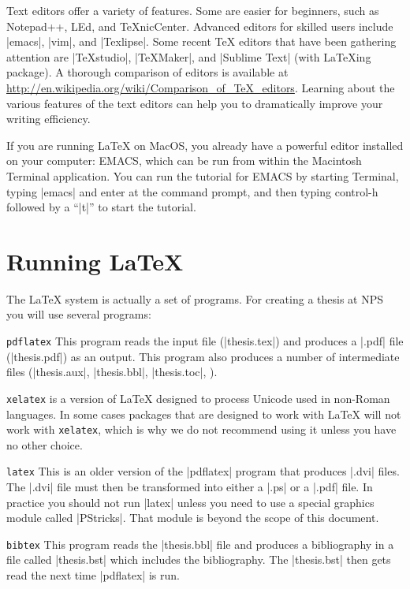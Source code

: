Text editors offer a variety of features.
Some are easier for beginners, such as Notepad++, LEd, and TeXnicCenter.
Advanced editors for skilled users include |emacs|, |vim|, and |Texlipse|.
Some recent TeX editors that have been gathering attention are |TeXstudio|,
|TeXMaker|, and |Sublime Text| (with LaTeXing package).  A thorough comparison
of editors is available at
\url{http://en.wikipedia.org/wiki/Comparison_of_TeX_editors}.  Learning about
the various features of the text editors can help you to dramatically improve
your writing efficiency.

If you are running \LaTeX{} on MacOS, you already have a powerful editor
installed on your computer: EMACS, which can be run from within the Macintosh
Terminal application. You can run the tutorial for EMACS by starting Terminal,
typing |emacs| and enter at the command prompt, and then typing control-h
followed by a ``|t|'' to start the tutorial.


\section{Running \LaTeX}\label{runninglatex}
The \LaTeX{} system is actually a set of programs. For creating a thesis at NPS you will use several programs:

\begin{description}

\item{\texttt{pdflatex}} This program reads the input file (\eg |thesis.tex|)
  and produces a |.pdf| file (\eg |thesis.pdf|) as an output. This program also
  produces a number of intermediate files (|thesis.aux|, |thesis.bbl|,
  |thesis.toc|, \etc).

\item{\texttt{xelatex}} is a version of \LaTeX{} designed to process Unicode used
  in non-Roman languages. In some cases packages that are designed to work with
  \LaTeX{} will not work with \texttt{xelatex}, which is why we do not recommend
  using it unless you have no other choice.

\item{\texttt{latex}} This is an older version of the |pdflatex| program that
  produces |.dvi| files. The |.dvi| file must then be transformed into either a
  |.ps| or a |.pdf| file. In practice you should not run |latex| unless you
  need to use a special graphics module called |PStricks|. That module is
  beyond the scope of this document.

\item{\texttt{bibtex}} This program reads the |thesis.bbl| file and produces a
  bibliography in a file called |thesis.bst| which includes the bibliography.
  The |thesis.bst| then gets read the next time |pdflatex| is run.

\end{description}

